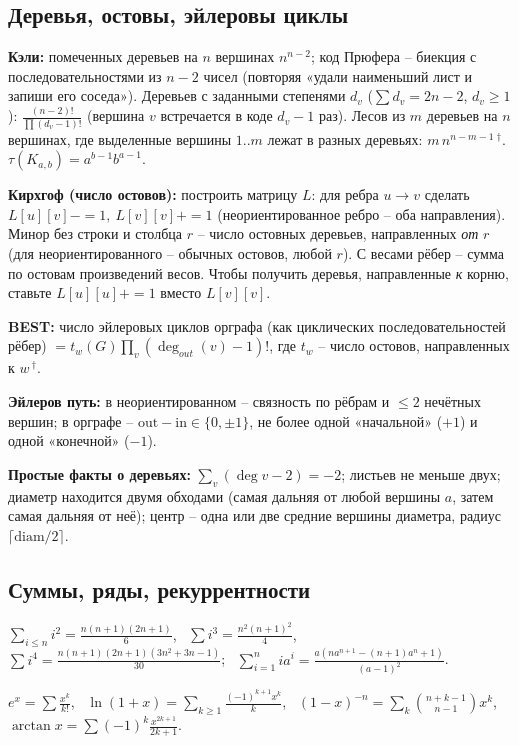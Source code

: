 \subsection{Деревья, остовы, эйлеровы циклы}
\textbf{Кэли:} помеченных деревьев на $n$ вершинах $n^{n-2}$; код Прюфера -- биекция с последовательностями из $n{-}2$ чисел (повторяя «удали наименьший лист и запиши его соседа»). Деревьев с заданными степенями $d_v$ ($\sum d_v=2n{-}2$, $d_v\ge1$): $\frac{(n-2)!}{\prod(d_v-1)!}$ (вершина $v$ встречается в коде $d_v{-}1$ раз). Лесов из $m$ деревьев на $n$ вершинах, где выделенные вершины $1..m$ лежат в разных деревьях: $m\,n^{n-m-1}$\,$^\dagger$. $\tau(K_{a,b})=a^{b-1}b^{a-1}$.
\par \textbf{Кирхгоф (число остовов):} построить матрицу $L$: для ребра $u\to v$ сделать $L[u][v]{-}{=}1,\ L[v][v]{+}{=}1$ (неориентированное ребро -- оба направления). Минор без строки и столбца $r$ -- число остовных деревьев, направленных \emph{от} $r$ (для неориентированного -- обычных остовов, любой $r$). С весами рёбер -- сумма по остовам произведений весов. Чтобы получить деревья, направленные \emph{к} корню, ставьте $L[u][u]{+}{=}1$ вместо $L[v][v]$.
\par \textbf{BEST:} число эйлеровых циклов орграфа (как циклических последовательностей рёбер) $=t_w(G)\prod_v(\deg_{out}(v){-}1)!$, где $t_w$ -- число остовов, направленных к $w$\,$^\dagger$.
\par \textbf{Эйлеров путь:} в неориентированном -- связность по рёбрам и $\le2$ нечётных вершин; в орграфе -- $\mathrm{out}-\mathrm{in}\in\{0,\pm1\}$, не более одной «начальной» ($+1$) и одной «конечной» ($-1$).
\par \textbf{Простые факты о деревьях:} $\sum_v(\deg v-2)=-2$; листьев не меньше двух; диаметр находится двумя обходами (самая дальняя от любой вершины $a$, затем самая дальняя от неё); центр -- одна или две средние вершины диаметра, радиус $\lceil\mathrm{diam}/2\rceil$.
\subsection{Суммы, ряды, рекуррентности}
$\sum_{i\le n} i^2=\frac{n(n{+}1)(2n{+}1)}6$, \ $\sum i^3=\frac{n^2(n{+}1)^2}4$, \ $\sum i^4=\frac{n(n{+}1)(2n{+}1)(3n^2{+}3n{-}1)}{30}$; \ $\sum_{i=1}^nia^i=\frac{a(na^{n+1}-(n{+}1)a^n+1)}{(a-1)^2}$.
\par $e^x=\sum\frac{x^k}{k!}$, \ $\ln(1{+}x)=\sum_{k\ge1}\frac{(-1)^{k+1}x^k}k$, \ $(1{-}x)^{-n}=\sum_k\binom{n+k-1}{n-1}x^k$, \ $\arctan x=\sum(-1)^k\frac{x^{2k+1}}{2k+1}$.
